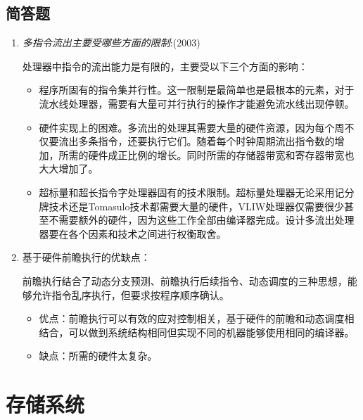 \documentclass[a4paper]{ctexart}
\begin{document}
\subsection{简答题}
\begin{enumerate}
  \item \emph{多指令流出主要受哪些方面的限制}:(2003)
  
  处理器中指令的流出能力是有限的，主要受以下三个方面的影响：
  \begin{itemize}
    \item 程序所固有的指令集并行性。这一限制是最简单也是最根本的元素，对于流水线处理器，需要有大量可并行执行的操作才能避免流水线出现停顿。
    \item 硬件实现上的困难。多流出的处理其需要大量的硬件资源，因为每个周不仅要流出多条指令，还要执行它们。随着每个时钟周期流出指令数的增加，所需的硬件成正比例的增长。同时所需的存储器带宽和寄存器带宽也大大增加了。
    \item 超标量和超长指令字处理器固有的技术限制。超标量处理器无论采用记分牌技术还是Tomasulo技术都需要大量的硬件，VLIW处理器仅需要很少甚至不需要额外的硬件，因为这些工作全部由编译器完成。设计多流出处理器要在各个因素和技术之间进行权衡取舍。
  \end{itemize}
  
  \item 基于硬件前瞻执行的优缺点：
  
  前瞻执行结合了动态分支预测、前瞻执行后续指令、动态调度的三种思想，能够允许指令乱序执行，但要求按程序顺序确认。
  \begin{itemize}
    \item 优点：前瞻执行可以有效的应对控制相关，基于硬件的前瞻和动态调度相结合，可以做到系统结构相同但实现不同的机器能够使用相同的编译器。
    \item 缺点：所需的硬件太复杂。
  \end{itemize}
  
\end{enumerate}

\newpage
\section{存储系统}
\end{document}
